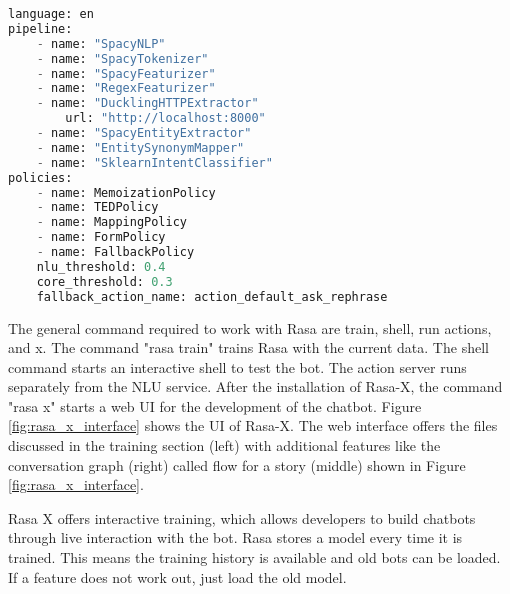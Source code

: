 \begin{lstlisting}[caption={Rasa Configuration}, label={lst:rasa_config},captionpos=b,frame=single,language={Python},commentstyle=\color{mygreen},keywordstyle=\color{blue},
    morekeywords={language, pipeline, policies, name}]                
language: en
pipeline: 
    - name: "SpacyNLP"
    - name: "SpacyTokenizer"
    - name: "SpacyFeaturizer"
    - name: "RegexFeaturizer"
    - name: "DucklingHTTPExtractor"
        url: "http://localhost:8000"
    - name: "SpacyEntityExtractor"
    - name: "EntitySynonymMapper"
    - name: "SklearnIntentClassifier"
policies:
    - name: MemoizationPolicy
    - name: TEDPolicy
    - name: MappingPolicy
    - name: FormPolicy
    - name: FallbackPolicy
    nlu_threshold: 0.4
    core_threshold: 0.3
    fallback_action_name: action_default_ask_rephrase
\end{lstlisting} 
The general command required to work with Rasa are train, shell, run actions, and x.
The command "rasa train" trains Rasa with the current data.
The shell command starts an interactive shell to test the bot.
The action server runs separately from the NLU service.
After the installation of Rasa-X, the command "rasa x" starts a web UI for the development of the chatbot.
Figure \ref{fig:rasa_x_interface} shows the UI of Rasa-X.
The web interface offers the files discussed in the training section (left) with additional features like the conversation graph (right) called flow for a story (middle) shown in Figure \ref{fig:rasa_x_interface}.

Rasa X offers interactive training, which allows developers to build chatbots through live interaction with the bot. 
Rasa stores a model every time it is trained.
This means the training history is available and old bots can be loaded.
If a feature does not work out, just load the old model.

